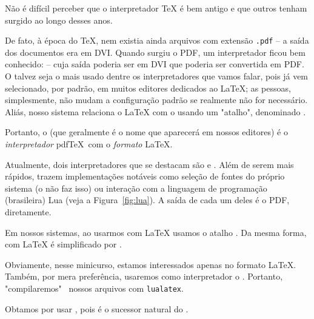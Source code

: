 Não é difícil perceber que o interpretador \TeX{} é bem antigo e que outros tenham
surgido ao longo desses anos.
De fato, à época do \TeX, nem existia ainda arquivos com extensão  \texttt{.pdf} 
-- a saída dos documentos era em DVI.
Quando surgiu o PDF, um interpretador ficou bem conhecido:  -- cuja 
saída poderia ser em DVI que poderia ser convertida em PDF. 
O  talvez seja o mais usado dentre os interpretadores que vamos 
falar, pois já vem selecionado, por padrão, em muitos editores dedicados ao 
\LaTeX {}; 
as pessoas, simplesmente, não mudam a configuração padrão se realmente não 
for necessário.
Aliás, nosso sistema relaciona o \LaTeX{} com o  usando um "atalho", 
denominado .

Portanto, o  (que geralmente é o nome que aparecerá em nossos 
editores) é o \textit{interpretador} pdf\TeX\ com o \textit{formato} \LaTeX. 

Atualmente, dois interpretadores que se destacam são  e .
Além de serem mais rápidos, trazem implementações notáveis como seleção de fontes 
do próprio sistema (o  não faz isso) ou interação com a linguagem 
de programação (brasileira) Lua (veja a Figura~\ref{fig:lua}). 
A saída de cada um deles é o PDF, diretamente.

Em nossos sistemas, ao usarmos  com \LaTeX{} usamos o atalho 
.
Da mesma forma,  com \LaTeX{} é simplificado por .

Obviamente, nesse minicurso, estamos interessados apenas no formato \LaTeX.
Também, por mera preferência, usaremos como interpretador o .
Portanto, "compilaremos" \, nossos arquivos com \texttt{lualatex}.

Obtamos por usar \lualatex, pois é o sucessor natural do \pdflatex. 

